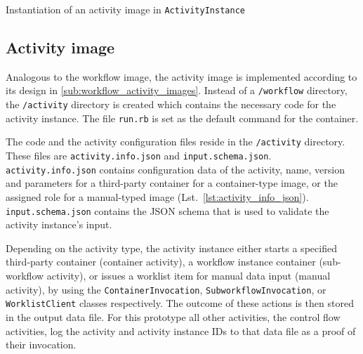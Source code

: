     \begin{listing}[htbp]
      \inputminted[firstline=40,lastline=68,fontsize=\footnotesize,linenos=true,numberblanklines=true,showspaces=false,breaklines=true,baselinestretch=1,gobble=2]{ruby}{../code/wf_base/activity_instance.rb}
      \caption[Instantiation of an activity image in ActivityInstance]{Instantiation of an activity image in \texttt{ActivityInstance}}
      \label{lst:instantiation_of_an_activity_image_in_activityinstance}
    \end{listing}


  \subsection{Activity image} %
  \label{sub:activity_containers}
    Analogous to the workflow image, the activity image is implemented according to its design in \ref{sub:workflow_activity_images}. Instead of a \texttt{/workflow} directory, the \texttt{/activity} directory is created which contains the necessary code for the activity instance. The file \texttt{run.rb} is set as the default command for the container.


    The code and the activity configuration files reside in the \texttt{/activity} directory. These files are \texttt{activity.info.json} and \texttt{input.schema.json}. \texttt{activity.info.json} contains configuration data of the activity, \eg name, version and parameters for a third-party container for a container-type image, or the assigned role for a manual-typed image (Lst.~\ref{lst:activity_info_json}). \texttt{input.schema.json} contains the \ac{JSON} schema that is used to validate the activity instance's input.

    Depending on the activity type, the activity instance either starts a specified third-party container (container activity), a workflow instance container (sub-workflow activity), or issues a worklist item for manual data input (manual activity), by using the \texttt{ContainerInvocation}, \texttt{SubworkflowInvocation}, or \texttt{WorklistClient} classes respectively. The outcome of these actions is then stored in the output data file. For this prototype all other activities, \ie the control flow activities, log the activity and activity instance \acp{ID} to that data file as a proof of their invocation.

